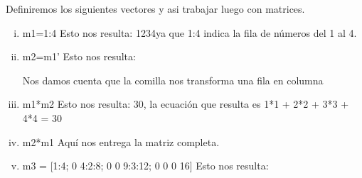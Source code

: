 \documentclass[a4paper]{article}
\begin{document}
Definiremos los siguientes vectores y asi trabajar luego con matrices.
\begin{enumerate}[i)]
\item m1=1:4  Esto nos resulta:  1\hspace{0,3cm}2\hspace{0,3cm}3\hspace{0,3cm}4\hspace{0,3cm}ya que 1:4 indica la fila de números del 1 al 4.
\item  m2=m1'  Esto nos resulta:

\vspace{0,01cm}{1}

\vspace{0,01cm}{2}

\vspace{0,01cm}{3}

\vspace{0,01cm}{4}

\vspace{0,5cm}
Nos damos cuenta que la comilla nos transforma una fila en columna
\item m1*m2  Esto nos resulta:  30, la ecuación que resulta es 1*1 + 2*2 + 3*3 + 4*4 = 30
 
\item m2*m1  Aquí nos entrega la matriz completa.





\vspace{0,4cm}

\item m3 = [1:4; 0 4:2:8; 0 0 9:3:12; 0 0 0 16] Esto nos resulta:


\end{enumerate}
\end{document}
